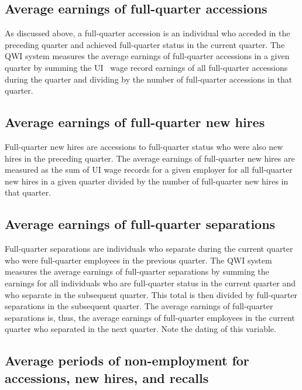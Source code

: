 \subsection{Average earnings of full-quarter accessions}


As discussed above, a full-quarter accession is an individual who acceded in
the preceding quarter and achieved full-quarter status in the current
quarter. The QWI system measures the average earnings of full-quarter
accessions in a given quarter by summing the UI%
\ wage record earnings of all full-quarter accessions during the
quarter and dividing by the number of full-quarter accessions in that
quarter.

\subsection{Average earnings of full-quarter new hires}


Full-quarter new hires are accessions to full-quarter status who were also
new hires in the preceding quarter. The average earnings of full-quarter new
hires are measured as the sum of UI%
 wage records for a given employer for all full-quarter new hires
in a given quarter divided by the number of full-quarter new hires in that
quarter.

\subsection{Average earnings of full-quarter separations}


Full-quarter separations are individuals who separate during the current
quarter who were full-quarter employees in the previous quarter. The QWI
system measures the average earnings of full-quarter separations by summing
the earnings for all individuals who are full-quarter status in the current
quarter and who separate in the subsequent quarter. This total is then
divided by full-quarter separations in the subsequent quarter. The average
earnings of full-quarter separations is, thus, the average earnings of
full-quarter employees in the current quarter who separated in the next
quarter. Note the dating of this variable.

\subsection{Average periods of non-employment for accessions, new hires, and
recalls}

